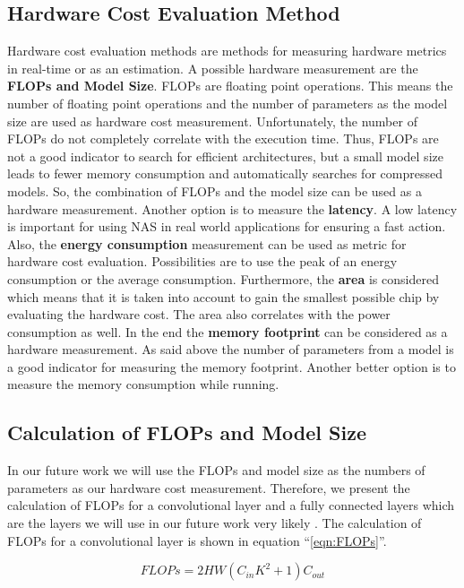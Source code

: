 \documentclass[conference]{IEEEtran}
\begin{document}
\subsection{Hardware Cost Evaluation Method}
Hardware cost evaluation methods are methods for measuring hardware metrics in real-time or as an estimation. A possible hardware measurement are the \textbf{FLOPs and Model Size}. FLOPs are floating point operations. This means the number of floating point operations and the number of parameters as the model size are used as hardware cost measurement. Unfortunately, the number of FLOPs do not completely correlate with the execution time. Thus, FLOPs are not a good indicator to search for efficient architectures, but a small model size leads to fewer memory consumption and automatically searches for compressed models. So, the combination of FLOPs and the model size can be used as a hardware measurement. Another option is to measure the \textbf{latency}. A low latency is important for using NAS in real world applications for ensuring a fast action. Also, the \textbf{energy consumption} measurement can be used as metric for hardware cost evaluation. Possibilities are to use the peak of an energy consumption or the average consumption. Furthermore, the \textbf{area} is considered which means that it is taken into account to gain the smallest possible chip by evaluating the hardware cost. The area also correlates with the power consumption as well. In the end the \textbf{memory footprint} can be considered as a hardware measurement. As said above the number of parameters from a model is a good indicator for measuring the memory footprint. Another better option is to measure the memory consumption while running. 

\subsection{Calculation of FLOPs and Model Size}
In our future work we will use the FLOPs and model size as the numbers of parameters as our hardware cost measurement. Therefore, we present the calculation of FLOPs for a convolutional layer and a fully connected layers which are the layers we will use in our future work very likely \cite{bib5}. The calculation of FLOPs for a convolutional layer is shown in equation ``\eqref{eqn:FLOPs}''.

\begin{equation}
\label{eqn:FLOPs}
FLOPs = 2HW(C_{in}K^{2}+1)C_{out}
\end{equation} 
\end{document}
